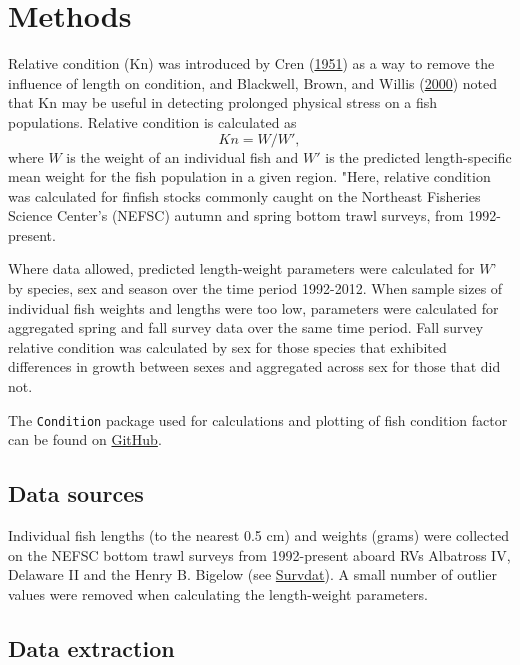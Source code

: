 \documentclass[
]{book}
\begin{document}
\hypertarget{methods-12}{%
\section{Methods}\label{methods-12}}

Relative condition (Kn) was introduced by Cren (\protect\hyperlink{ref-Cren1951a}{1951}) as a way to remove the influence of length on condition, and Blackwell, Brown, and Willis (\protect\hyperlink{ref-Blackwell2000}{2000}) noted that Kn may be useful in detecting prolonged physical stress on a fish populations. Relative condition is calculated as
\[Kn = W/W',\] where \(W\) is the weight of an individual fish and \(W'\) is the predicted length-specific mean weight for the fish population in a given region. "Here, relative condition was calculated for finfish stocks commonly caught on the Northeast Fisheries Science Center's (NEFSC) autumn and spring bottom trawl surveys, from 1992-present.

Where data allowed, predicted length-weight parameters were calculated for \(W’\) by species, sex and season over the time period 1992-2012. When sample sizes of individual fish weights and lengths were too low, parameters were calculated for aggregated spring and fall survey data over the same time period. Fall survey relative condition was calculated by sex for those species that exhibited differences in growth between sexes and aggregated across sex for those that did not.

The \texttt{Condition} package used for calculations and plotting of fish condition factor can be found on \href{https://github.com/Laurels1/Condition}{GitHub}.

\hypertarget{data-sources-12}{%
\subsection{Data sources}\label{data-sources-12}}

Individual fish lengths (to the nearest 0.5 cm) and weights (grams) were collected on the NEFSC bottom trawl surveys from 1992-present aboard RVs Albatross IV, Delaware II and the Henry B. Bigelow (see \protect\hyperlink{survdat}{Survdat}). A small number of outlier values were removed when calculating the length-weight parameters.

\hypertarget{data-extraction-11}{%
\subsection{Data extraction}\label{data-extraction-11}}
\end{document}
